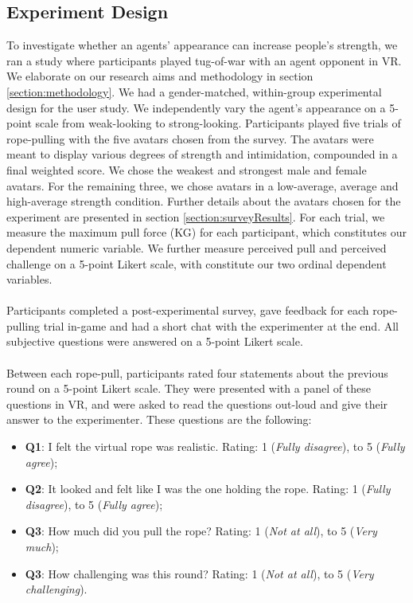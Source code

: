 \subsection{Experiment Design}
\label{subsection:ExperimentDesign}
To investigate whether an agents' appearance can increase people's strength, we ran a study where participants played tug-of-war with an agent opponent in VR. We elaborate on our research aims and methodology in section \ref{section:methodology}. We had a gender-matched, within-group experimental design for the user study. We independently vary the agent's appearance on a 5-point scale from weak-looking to strong-looking. Participants played five trials of rope-pulling with the five avatars chosen from the survey. The avatars were meant to display various degrees of strength and intimidation, compounded in a final weighted score. We chose the weakest and strongest male and female avatars. For the remaining three, we chose avatars in a low-average, average and high-average strength condition. Further details about the avatars chosen for the experiment are presented in section \ref{section:surveyResults}. For each trial, we measure the maximum pull force (KG) for each participant, which constitutes our dependent numeric variable. We further measure perceived pull and perceived challenge on a 5-point Likert scale, with constitute our two ordinal dependent variables.\\
\\
Participants completed a post-experimental survey, gave feedback for each rope-pulling trial in-game and had a short chat with the experimenter at the end. All subjective questions were answered on a 5-point Likert scale.\\
\\
Between each rope-pull, participants rated four statements about the previous round on a 5-point Likert scale. They were presented with a panel of these questions in VR, and were asked to read the questions out-loud and give their answer to the experimenter. These questions are the following:
\begin{itemize}
\label{enum:panelQuestions}
\itemsep0em
\item \textbf{Q1}: I felt the virtual rope was realistic. Rating: 1 (\textit{Fully disagree}), to 5 (\textit{Fully agree});
\item \textbf{Q2}: It looked and felt like I was the one holding the rope. Rating: 1 (\textit{Fully disagree}), to 5 (\textit{Fully agree});
 \item \textbf{Q3}: How much did you pull the rope? Rating: 1 (\textit{Not at all}), to 5 (\textit{Very much});
\item \textbf{Q3}: How challenging was this round? Rating: 1 (\textit{Not at all}), to 5 (\textit{Very challenging}).
\end{itemize}
